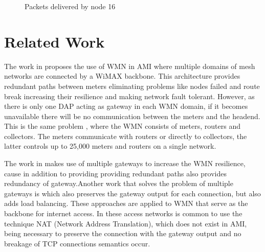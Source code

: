 \documentclass[conference]{IEEEtran}
\begin{document}
\begin{figure}[ht]
{    
  }
  \caption{Packets delivered by node 16}
  \label{n16-dap2}
\end{figure}


\section{Related Work}

The work in \cite{Gungor2006}  proposes the use of WMN in AMI where multiple domains of mesh networks are connected by a WiMAX backbone. This architecture provides redundant paths between meters eliminating problems like nodes failed and route break increasing their resilience and making network fault tolerant. However, as there is only one DAP acting as gateway in each WMN domain, if it becomes unavailable there will be no communication between the meters and the headend. This is the same problem \cite{Silva2010}, where the WMN consists of meters, routers and collectors. The meters communicate with routers or directly to collectors, the latter controls up to 25,000 meters and routers on a single network.

The work in \cite{Silva2010} makes use of multiple gateways to increase the WMN resilience, cause in addition to providing  providing redundant paths also provides redundancy of gateway.Another work that solves the problem of multiple gateways is \cite{ClaytonR.daSilva2011}  which also preserves the gateway output for each connection, but also adds load balancing. These approaches are applied to WMN that serve as the backbone for internet access. In these access networks is common to use the technique NAT (Network Address Translation), which does not exist in AMI, being necessary to preserve the connection with the gateway output and no breakage of TCP connections semantics occur.
\end{document}
